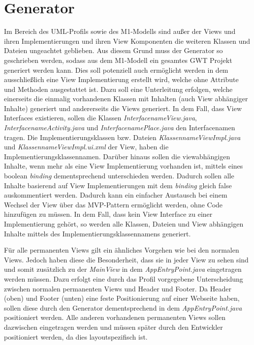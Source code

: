\section{Generator}\label{AufBGenerator}
Im Bereich des UML-Profils sowie des M1-Modells sind außer der Views und ihren
Implementierungen und ihren View Komponenten die weiteren Klassen und Dateien
ungeachtet geblieben. Aus diesem Grund muss der Generator so geschrieben werden,
sodass aus dem M1-Modell ein gesamtes GWT Projekt generiert werden kann. Dies
soll potenziell auch ermöglicht werden in dem ausschließlich eine View
Implementierung erstellt wird, welche ohne Attribute und Methoden ausgestattet ist. Dazu soll
eine Unterleitung erfolgen, welche einerseits die einmalig vorhandenen Klassen
mit Inhalten (auch View abhängiger Inhalte) generiert und andererseits die Views
generiert. In dem Fall, dass View Interfaces existieren, sollen die Klassen
\textit{\grqq{}Interfacename\grqq{}View.java}, \textit{\grqq{}Interfacename\grqq{}Activity.java} und
\textit{\grqq{}Interfacename\grqq{}Place.java} den Interfacenamen tragen. Die
Implementierungsklassen bzw. Dateien \textit{\grqq{}Klassenname\grqq{}ViewImpl.java} und
\textit{\grqq{}Klassenname\grqq{}ViewImpl.ui.xml} der View, haben die
Implementierungsklassennamen. Darüber hinaus sollen die viewabhängigen Inhalte,
wenn mehr als eine View Implementierung vorhanden ist, mittels eines boolean
\textit{binding} dementsprechend unterschieden werden. Dadurch sollen alle
Inhalte basierend auf View Implementierungen mit dem
\textit{binding} gleich false auskommentiert werden.
Dadurch kann ein einfacher Austausch bei einem Wechsel der View über das
MVP-Pattern ermöglicht werden, ohne Code hinzufügen zu müssen.
In dem Fall, dass kein View Interface zu einer Implementierung gehört, so werden
alle Klassen, Dateien und View abhängigen Inhalte mittels des
Implementierungsklassennamens generiert.

Für alle permanenten Views gilt ein
ähnliches Vorgehen wie bei den normalen Views. Jedoch haben diese die
Besonderheit, dass sie in jeder View zu sehen sind und somit zusätzlich zu der
\textit{MainView} in dem \textit{AppEntryPoint.java} eingetragen
werden müssen. Dazu erfolgt eine durch das Profil vorgegebene Unterscheidung
zwischen normalen permanenten Views und Header und Footer. Da Header (oben) und Footer
(unten) eine feste Positionierung auf einer Webseite haben, sollen diese durch
den Generator dementsprechend in dem \textit{AppEntryPoint.java} positioniert
werden.
Alle anderen vorhandenen permanenten Views sollen dazwischen eingetragen werden
und müssen später durch den Entwickler positioniert werden, da dies
layoutspezifisch ist.


